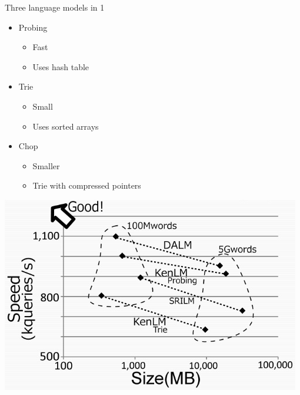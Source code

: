\documentclass[landscape]{uedslides2C}
\begin{document}


Three language models in 1
\begin{itemize}
\item Probing
  \begin{itemize}
  \item Fast
  \item Uses hash table
  \end{itemize}
\item Trie
  \begin{itemize}
  \item Small
  \item Uses sorted arrays
  \end{itemize}
\item Chop
  \begin{itemize}
  \item Smaller
  \item Trie with compressed pointers
  \end{itemize}
\end{itemize}



\begin{center} 
\includegraphics[scale=1.0]{DALM.png}\vspace{-20mm}
\end{center}
\end{document}
